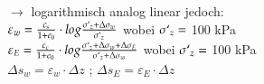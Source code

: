 \begin{minipage}{\linewidth}
	\vspace{\baselineskip}
	$\rightarrow$ logarithmisch analog linear jedoch: \\
	$\varepsilon_w = \frac{c_s}{1 + e_0} \cdot log \frac{\sigma`_z + \Delta \sigma_w}{\sigma`_z}$ wobei $\sigma`_z =$ 100 kPa \\
	$\varepsilon_E = \frac{c_c}{1 + e_0} \cdot log \frac{\sigma`_z + \Delta \sigma_w + \Delta \sigma_E}{\sigma`_z + \Delta \sigma_w}$ wobei $\sigma`_z =$ 100 kPa \\
	$\Delta s_w= \varepsilon_w \cdot \Delta z$ ; $\Delta s_E= \varepsilon_E \cdot \Delta z$ \\
	
	\end{minipage}